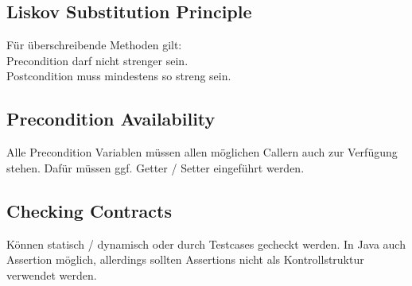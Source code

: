 \subsection{Liskov Substitution Principle}%
\label{dbc:sub:liskov}
Für überschreibende Methoden gilt:\\
Precondition darf nicht strenger sein.\\
Postcondition muss mindestens so streng sein.

\subsection{Precondition Availability}%
\label{dbc:sub:precondition}
Alle Precondition Variablen müssen allen möglichen Callern auch zur Verfügung stehen. Dafür müssen ggf. Getter / Setter
eingeführt werden.

\subsection{Checking Contracts}%
\label{dbc:sub:checking}
Können statisch / dynamisch oder durch Testcases gecheckt werden.
In Java auch Assertion möglich, allerdings sollten Assertions nicht als Kontrollstruktur verwendet werden.
  
    